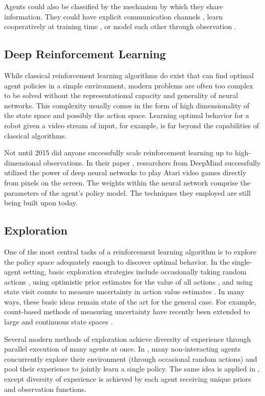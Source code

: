 \documentclass[12pt,journal,compsoc]{IEEEtran}
\begin{document}
	Agents could also be classified by the mechanism by which they share information. They could have explicit communication channels \cite{sukhbaatar_commnet}\!\cite{foerster_dial}\!\cite{peng_bicnet}, learn cooperatively at training time \cite{lowe_maddpg}\!\cite{foerster_coma}\!\cite{rashid_qmix}, or model each other through observation \cite{raileanu_som}\!\cite{hong_dpiqn}\!\cite{mtom}. 
	
	\subsection{Deep Reinforcement Learning}
	While classical reinforcement learning algorithms do exist that can find optimal agent policies in a simple environment, modern problems are often too complex to be solved without the representational capacity and generality of neural networks. This complexity usually comes in the form of high dimensionality of the state space and possibly the action space. Learning optimal behavior for a robot given a video stream of input, for example, is far beyond the capabilities of classical algorithms.
	
	Not until 2015 did anyone successfully scale reinforcement learning up to high-dimensional observations. In their paper \cite{dqn}, researchers from DeepMind successfully utilized the power of deep neural networks to play Atari video games directly from pixels on the screen. The weights within the neural network comprise the parameters of the agent's policy model. The techniques they employed are still being built upon today.
	
	\subsection{Exploration}
	One of the most central tasks of a reinforcement learning algorithm is to explore the policy space adequately enough to discover optimal behavior. In the single-agent setting, basic exploration strategies include occasionally taking random actions \cite{q_learning}, using optimistic prior estimates for the value of all actions \cite{optimistic_initialization}, and using state visit counts to measure uncertainty in action value estimates \cite{ucb}. In many ways, these basic ideas remain state of the art for the general case. For example, count-based methods of measuring uncertainty have recently been extended to large and continuous state spaces \cite{hashing} \cite{pseudo_counts}.
	
	Several modern methods of exploration achieve diversity of experience through parallel execution of many agents at once. In \cite{a3c}, many non-interacting agents concurrently explore their environment (through occasional random actions) and pool their experience to jointly learn a single policy. The same idea is applied in \cite{seed_sampling}, except diversity of experience is achieved by each agent receiving unique priors and observation functions. 
	
\end{document}
